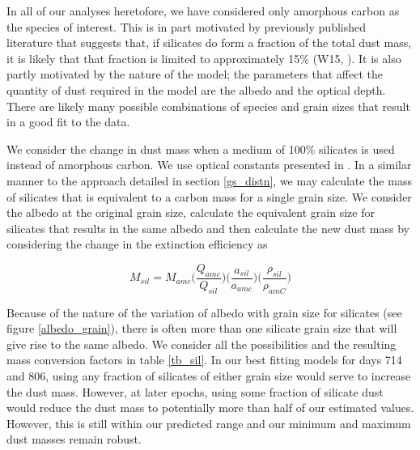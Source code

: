 \documentclass[useAMS,usenatbib,usegraphicx]{mnras}
\begin{document}
In all of our analyses heretofore, we have considered only amorphous carbon as the species of interest.  This is in part motivated by previously published literature that suggests that, if silicates do form a fraction of the total dust mass, it is likely that that fraction is limited to approximately 15\% (W15, \citet{Ercolano2007}).  It is also partly motivated by the nature of the model; the parameters that affect the quantity of dust required in the model are the albedo and the optical depth.  There are likely many possible combinations of species and grain sizes that result in a good fit to the data.  

We consider the change in dust mass when a medium of 100\% silicates is used instead of amorphous carbon.  We use optical constants presented in \cite{Draine1984}.  In a similar manner to the approach detailed in section \ref{gs_distn}, we may calculate the mass of silicates that is equivalent to a carbon mass for a single grain size.  We consider the albedo at the original grain size, calculate the equivalent grain size for silicates that results in the same albedo and then calculate the new dust mass by considering the change in the extinction efficiency as

\begin{equation}
M_{sil} = M_{amc} \Big( \frac{Q_{amc}}{Q_{sil}} \Big) \Big(\frac{a_{sil}}{a_{amc}}\Big) \Big(\frac{\rho_{sil}}{\rho_{amC}}\Big)
\end{equation}

Because of the nature of the variation of albedo with grain size for silicates (see figure \ref{albedo_grain}), there is often more than one silicate grain size that will give rise to the same albedo.  We consider all the possibilities and the resulting mass conversion factors in table \ref{tb_sil}.  In our best fitting models for days 714 and 806, using any fraction of silicates of either grain size would serve to increase the dust mass.  However, at later epochs, using some fraction of silicate dust would reduce the dust mass to potentially more than half of our estimated values. However, this is still within our predicted range and our minimum and maximum dust masses remain robust.
\end{document}
